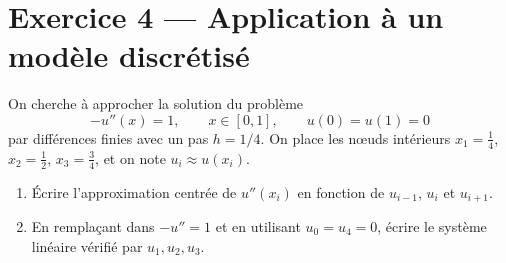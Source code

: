 \vspace{2em}
\section*{Exercice 4 --- Application à un modèle discrétisé}

On cherche à approcher la solution du problème
\[
  -u''(x) = 1,
  \qquad x \in [0,1],
  \qquad u(0) = u(1) = 0
\]
par différences finies avec un pas $h = 1/4$.
On place les n\oe uds intérieurs
$x_1 = \tfrac{1}{4}$, $x_2 = \tfrac{1}{2}$,
$x_3 = \tfrac{3}{4}$,
et on note $u_i \approx u(x_i)$.

\begin{enumerate}
\item Écrire l'approximation centrée de $u''(x_i)$
en fonction de $u_{i-1}$, $u_i$ et $u_{i+1}$.


\item En remplaçant dans $-u'' = 1$
et en utilisant $u_0 = u_4 = 0$,
écrire le système linéaire vérifié par $u_1, u_2, u_3$.



\end{enumerate}
